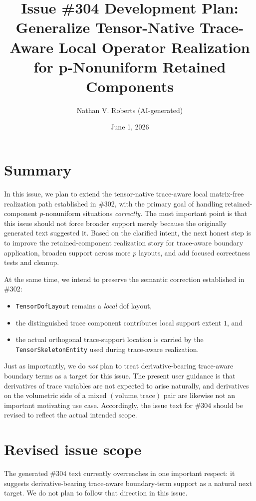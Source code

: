 \documentclass[11pt]{article}
\title{Issue \#304 Development Plan: Generalize Tensor-Native Trace-Aware Local Operator Realization for p-Nonuniform Retained Components}
\author{Nathan V. Roberts (AI-generated)}
\date{June 1, 2026}
\begin{document}
\maketitle

\section{Summary}

In this issue, we plan to extend the tensor-native trace-aware local matrix-free realization path established in \#302, with the primary goal of handling retained-component \(p\)-nonuniform situations \emph{correctly}. The most important point is that this issue should not force broader support merely because the originally generated text suggested it. Based on the clarified intent, the next honest step is to improve the retained-component realization story for trace-aware boundary application, broaden support across more \(p\) layouts, and add focused correctness tests and cleanup.

At the same time, we intend to preserve the semantic correction established in \#302:
\begin{itemize}[leftmargin=*]
  \item \texttt{TensorDofLayout} remains a \emph{local} dof layout,
  \item the distinguished trace component contributes local support extent \(1\), and
  \item the actual orthogonal trace-support location is carried by the \texttt{TensorSkeletonEntity} used during trace-aware realization.
\end{itemize}

Just as importantly, we do \emph{not} plan to treat derivative-bearing trace-aware boundary terms as a target for this issue. The present user guidance is that derivatives of trace variables are not expected to arise naturally, and derivatives on the volumetric side of a mixed \((\text{volume},\text{trace})\) pair are likewise not an important motivating use case. Accordingly, the issue text for \#304 should be revised to reflect the actual intended scope.

\section{Revised issue scope}

The generated \#304 text currently overreaches in one important respect: it suggests derivative-bearing trace-aware boundary-term support as a natural next target. We do not plan to follow that direction in this issue.
\end{document}
